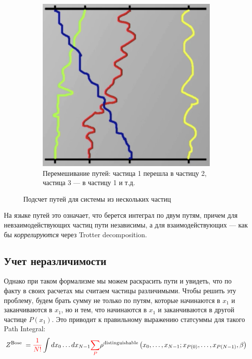 \begin{lecture}
\begin{figure}[ht]
\begin{subfigure}{0.33\columnwidth}
            \label{fig:two-paths-colored}
        \end{subfigure}
        \begin{subfigure}{0.66\columnwidth}
            \includegraphics[width=\linewidth]{fig/paths-permutations}
            \caption{Перемешивание путей: частица 1 перешла в частицу 2, частица 3 --- в частицу 1 и т.д.}
            \label{fig:paths-permutations}
        \end{subfigure}
        \caption{Подсчет путей для системы из нескольких частиц}
    \end{figure}

    На языке путей это означает, что берется интеграл по двум путям, причем для невзаимодействующих частиц пути независимы, а для взаимодействующих --- как бы \textit{коррелируются} через Trotter decomposition.

    \subsection{Учет неразличимости}

    Однако при таком формализме мы можем раскрасить пути и увидеть, что по факту в своих расчетах мы считаем частицы различимыми.
    Чтобы решить эту проблему, будем брать сумму не только по путям, которые начинаются в $x_1$ и заканчиваются в $x_1$, но и тем, что начинаются в $x_1$ и заканчиваются в другой частице $P(x_1)$.
    Это приводит к правильному выражению статсуммы для такого Path Integral:
    \begin{equation}
        \label{eq:Z_bosons-via-permutations}
        Z^{\text {Bose }} =
        {\color{red} \frac{1}{N!}}
        \int d x_{0} \ldots d x_{N-1}
        {\color{red} \sum_{P}}
        \rho^{\text{distinguishable}}\left(x_{0}, \ldots, x_{N-1} ; x_{P(0)}, \ldots, x_{P(N-1)}, \beta\right)
    \end{equation}


\end{lecture}

